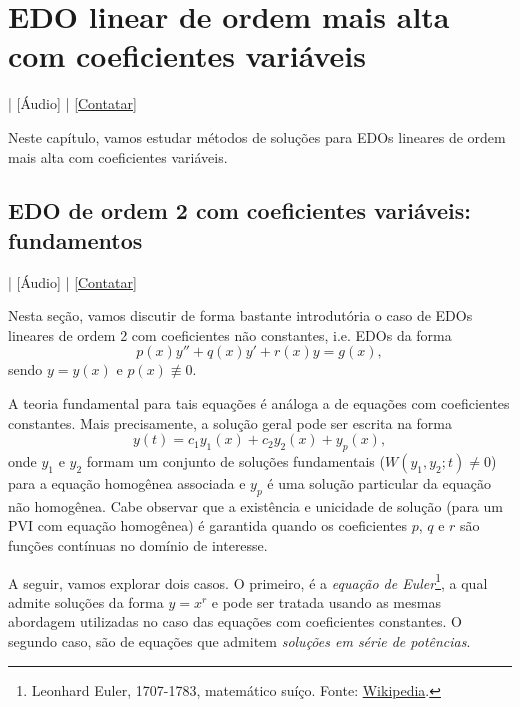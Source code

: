

\chapter{EDO linear de ordem mais alta com coeficientes variáveis}\label{cap_edolcv}
\thispagestyle{fancy}

\begin{flushright}
  [Vídeo] | [Áudio] | \href{https://phkonzen.github.io/notas/contato.html}{[Contatar]}
\end{flushright}

Neste capítulo, vamos estudar métodos de soluções para EDOs lineares de ordem mais alta com coeficientes variáveis.

\section{EDO de ordem 2 com coeficientes variáveis: fundamentos}\label{cap_edolcv_sec_edo2lcvfun}

\begin{flushright}
  [Vídeo] | [Áudio] | \href{https://phkonzen.github.io/notas/contato.html}{[Contatar]}
\end{flushright}

Nesta seção, vamos discutir de forma bastante introdutória o caso de EDOs lineares de ordem 2 com coeficientes não constantes, i.e. EDOs da forma
\begin{equation}
  p(x)y'' + q(x)y' + r(x)y = g(x),
\end{equation}
sendo $y = y(x)$ e $p(x)\not\equiv 0$.

A teoria fundamental para tais equações é análoga a de equações com coeficientes constantes. Mais precisamente, a solução geral pode ser escrita na forma
\begin{equation}
  y(t) = c_1y_1(x) + c_2y_2(x) + y_p(x),
\end{equation}
onde $y_1$ e $y_2$ formam um conjunto de soluções fundamentais ($W(y_1,y_2;t)\neq 0$) para a equação homogênea associada e $y_p$ é uma solução particular da equação não homogênea. Cabe observar que a existência e unicidade de solução (para um PVI com equação homogênea) é garantida quando os coeficientes $p$, $q$ e $r$ são funções contínuas no domínio de interesse.

A seguir, vamos explorar dois casos. O primeiro, é a \emph{equação de Euler}\footnote{Leonhard Euler, 1707-1783, matemático suíço. Fonte: \href{https://en.wikipedia.org/wiki/Leonhard_Euler}{Wikipedia}.}, a qual admite soluções da forma $y = x^r$ e pode ser tratada usando as mesmas abordagem utilizadas no caso das equações com coeficientes constantes. O segundo caso, são de equações que admitem \emph{soluções em série de potências}.

